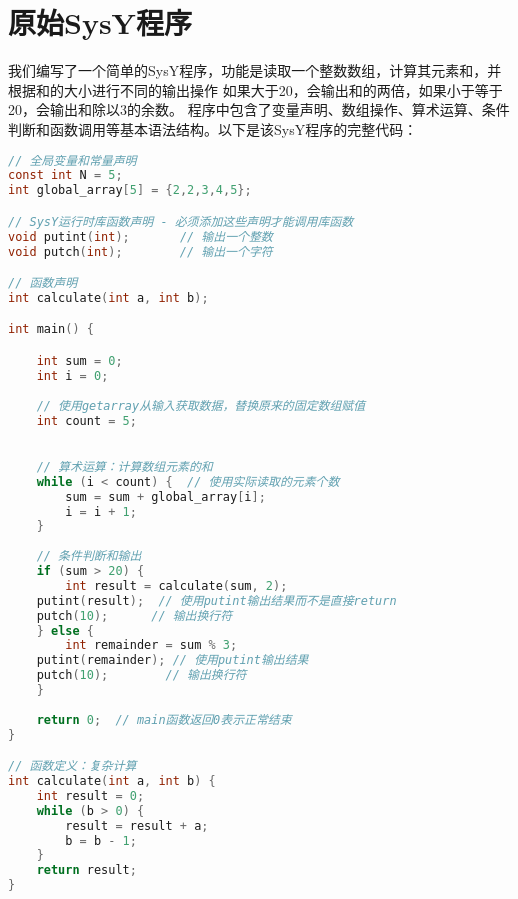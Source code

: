 \documentclass[UTF8,a4paper,10pt]{ctexart}
\begin{document}
\section{原始SysY程序}
我们编写了一个简单的SysY程序，功能是读取一个整数数组，计算其元素和，并根据和的大小进行不同的输出操作
如果大于20，会输出和的两倍，如果小于等于20，会输出和除以3的余数。
程序中包含了变量声明、数组操作、算术运算、条件判断和函数调用等基本语法结构。以下是该SysY程序的完整代码：
\begin{lstlisting}[title=逐列访问平凡算法,frame=trbl,language={C}]
// 全局变量和常量声明
const int N = 5;
int global_array[5] = {2,2,3,4,5};

// SysY运行时库函数声明 - 必须添加这些声明才能调用库函数
void putint(int);       // 输出一个整数
void putch(int);        // 输出一个字符

// 函数声明
int calculate(int a, int b);

int main() {

    int sum = 0;
    int i = 0;
    
    // 使用getarray从输入获取数据，替换原来的固定数组赋值
    int count = 5;

    
    // 算术运算：计算数组元素的和
    while (i < count) {  // 使用实际读取的元素个数
        sum = sum + global_array[i];
        i = i + 1;
    }
    
    // 条件判断和输出
    if (sum > 20) {
        int result = calculate(sum, 2);
    putint(result);  // 使用putint输出结果而不是直接return
    putch(10);      // 输出换行符
    } else {
        int remainder = sum % 3;
    putint(remainder); // 使用putint输出结果
    putch(10);        // 输出换行符
    }
    
    return 0;  // main函数返回0表示正常结束
}

// 函数定义：复杂计算
int calculate(int a, int b) {
    int result = 0;
    while (b > 0) {
        result = result + a;
        b = b - 1;
    }
    return result;
}\end{lstlisting}
\end{document}

